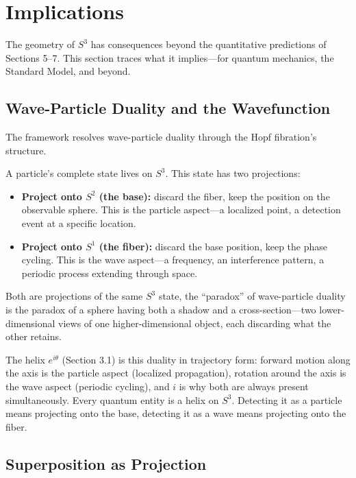 \documentclass[12pt]{article}
\begin{document}
\section{Implications}

The geometry of $S^3$ has consequences beyond the quantitative predictions of Sections 5--7. This section traces what it implies---for quantum mechanics, the Standard Model, and beyond.

\subsection{Wave-Particle Duality and the Wavefunction}

The framework resolves wave-particle duality through the Hopf fibration's structure.

A particle's complete state lives on $S^3$. This state has two projections:

\begin{itemize}
\item \textbf{Project onto $S^2$ (the base):} discard the fiber, keep the position on the observable sphere. This is the particle aspect---a localized point, a detection event at a specific location.
\item \textbf{Project onto $S^1$ (the fiber):} discard the base position, keep the phase cycling. This is the wave aspect---a frequency, an interference pattern, a periodic process extending through space.
\end{itemize}

Both are projections of the same $S^3$ state, the ``paradox'' of wave-particle duality is the paradox of a sphere having both a shadow and a cross-section---two lower-dimensional views of one higher-dimensional object, each discarding what the other retains.

The helix $e^{i\theta}$ (Section 3.1) is this duality in trajectory form: forward motion along the axis is the particle aspect (localized propagation), rotation around the axis is the wave aspect (periodic cycling), and $i$ is why both are always present simultaneously. Every quantum entity is a helix on $S^3$. Detecting it as a particle means projecting onto the base, detecting it as a wave means projecting onto the fiber.


\subsection{Superposition as Projection}
\end{document}
